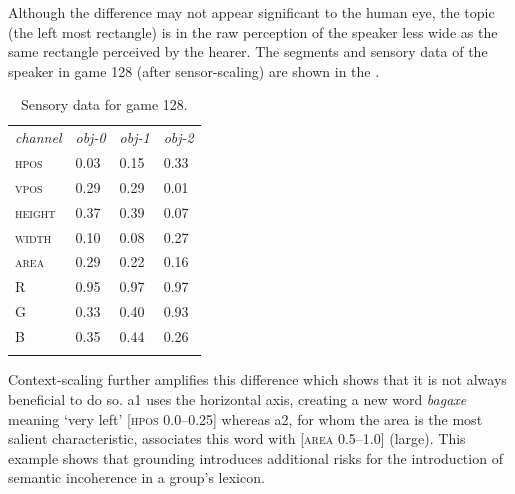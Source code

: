 Although the difference may not appear significant to 
the human eye, the topic (the left most rectangle) is 
in the raw perception of the speaker less wide as the same 
rectangle perceived by the hearer. 
The segments and sensory data of the speaker
in game 128 (after sensor-scaling) are shown in the 
. 

\begin{table}
\begin{center}
\begin{tabular}{llll}
\lsptoprule
{\itshape channel}& {\itshape obj-0} & {\itshape obj-1} & {\itshape obj-2}\\ 
\textsc{hpos} & 0.03 & 0.15 & 0.33\\ 
\textsc{vpos} & 0.29 & 0.29 & 0.01\\ 
\textsc{height} & 0.37 & 0.39 & 0.07\\ 
\textsc{width} & 0.10 & 0.08 & 0.27\\ 
\textsc{area} & 0.29 & 0.22 & 0.16\\ 
R & 0.95 & 0.97 & 0.97 \\ 
G & 0.33 & 0.40 & 0.93\\ 
B & 0.35 & 0.44 & 0.26\\ 
\lspbottomrule
\end{tabular}
\caption{\label{tab:game128}Sensory data for game 128.}
\end{center}
\end{table}
Context-scaling further
amplifies this difference which shows that it is not 
always beneficial to do so. {\bfshape a1} uses
the horizontal axis, creating a new word \textit{bagaxe} 
meaning `very left' [\textsc{hpos} 0.0–0.25] whereas {\bfshape a2}, for
whom the area is the most salient characteristic, 
associates this word with [\textsc{area} 0.5–1.0] (large). 
This example shows that grounding introduces 
additional risks for the introduction of semantic
incoherence in a group's lexicon. 

